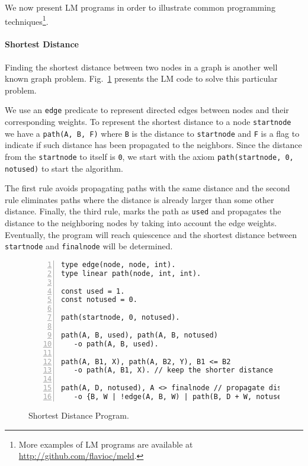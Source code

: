
We now present LM programs in order to illustrate common programming techniques\footnote{More examples of LM programs are available at \url{http://github.com/flavioc/meld}.}.

\paragraph{Shortest Distance}

Finding the shortest distance between two nodes in a graph is another well known graph problem.
Fig.~\ref{code:shortest_path} presents the LM code to solve this particular problem.

We use an \texttt{edge}
predicate to represent directed edges between nodes and their corresponding weights. To represent the shortest
distance to a node \texttt{startnode} we have a \texttt{path(A, B, F)} where \texttt{B} is the distance to \texttt{startnode}
and \texttt{F} is a flag to indicate if such distance has been propagated to the neighbors. Since the distance from
the \texttt{startnode} to itself is \texttt{0}, we start with the axiom \texttt{path(startnode, 0, notused)} to start the algorithm.

The first rule avoids propagating paths with the same distance and the second rule eliminates paths where the distance
is already larger than some other distance. Finally, the third rule, marks the path as \texttt{used} and propagates
the distance to the neighboring nodes by taking into account the edge weights.
Eventually, the program will reach quiescence and the shortest distance between \texttt{startnode} and \texttt{finalnode}
will be determined.

\newcommand{\BigO}[1]{\ensuremath{\operatorname{O}\bigl(#1\bigr)}}

\begin{figure}[h!]
\footnotesize\begin{Verbatim}[numbers=left]
type edge(node, node, int).
type linear path(node, int, int).

const used = 1.
const notused = 0.

path(startnode, 0, notused).

path(A, B, used), path(A, B, notused)
   -o path(A, B, used).

path(A, B1, X), path(A, B2, Y), B1 <= B2
   -o path(A, B1, X). // keep the shorter distance

path(A, D, notused), A <> finalnode // propagate distance
   -o {B, W | !edge(A, B, W) | path(B, D + W, notused)}, path(A, D, used).
\end{Verbatim}
\caption{Shortest Distance Program.}
\label{code:shortest_path}
\end{figure}
\normalsize

